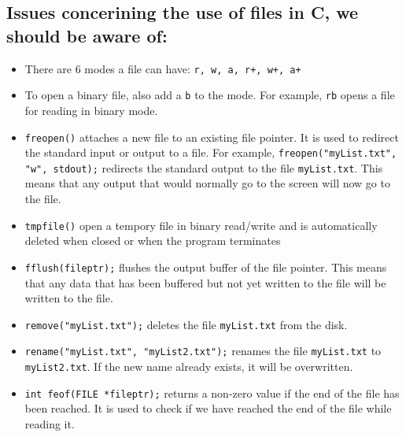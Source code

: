\documentclass[a4paper, 10pt]{article}
\begin{document}
\subsection{Issues concerining the use of files in C, we should be aware of:}
\begin{itemize}
    \item There are 6 modes a file can have: \texttt{r, w, a, r+, w+, a+}
    \item To open a binary file, also add a \texttt{b} to the mode. For example, \texttt{rb} opens a file for reading in binary mode.
    \item \texttt{freopen()} attaches a new file to an existing file pointer. It is used to redirect the standard input or output to a file. For example, \texttt{freopen("myList.txt", "w", stdout);} redirects the standard output to the file \texttt{myList.txt}. This means that any output that would normally go to the screen will now go to the file.
    \item \texttt{tmpfile()} open a tempory file in binary read/write and is automatically deleted when closed or when the program terminates
    \item \texttt{fflush(fileptr);} flushes the output buffer of the file pointer. This means that any data that has been buffered but not yet written to the file will be written to the file.
    \item \texttt{remove("myList.txt");} deletes the file \texttt{myList.txt} from the disk.
    \item \texttt{rename("myList.txt", "myList2.txt");} renames the file \texttt{myList.txt} to \texttt{myList2.txt}. If the new name already exists, it will be overwritten.
    \item \texttt{int feof(FILE *fileptr);} returns a non-zero value if the end of the file has been reached. It is used to check if we have reached the end of the file while reading it.
\end{itemize}
\end{document}
